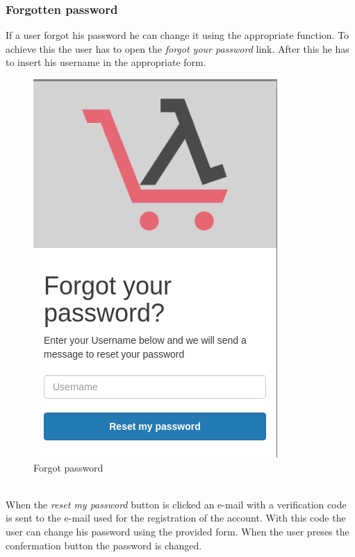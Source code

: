 \subsubsection{Forgotten password}
If a user forgot his password he can change it using the appropriate function. To achieve this the user has to open the \textit{forgot your password} link. After this he has to insert his username in the appropriate form.
\begin{figure}[!ht]
    \caption{Forgot password}
    \vspace{10px}
    \includegraphics[scale=0.3]{../../../../Images/userManual/forgotPWD.png}
    \centering
\end{figure}
\\
When the \textit{reset my password} button is clicked an e-mail with a verification code is sent to the e-mail used for the registration of the account. With this code the user can change his password using the provided form. When the user preses the confermation button the password is changed.

